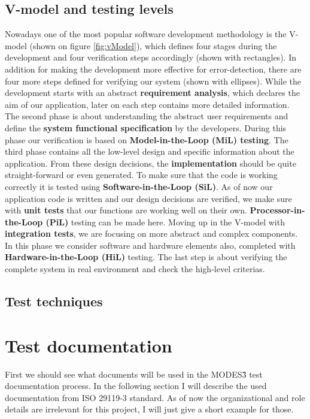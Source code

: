 \subsection{V-model and testing levels}
Nowadays one of the most popular software development methodology is the V-model \cite{Vmodel} (shown on figure \ref{fig:vModel}), which defines four stages during the development and four verification steps accordingly (shown with rectangles). In addition for making the development more effective for error-detection, there are four more steps defined for verifying our system \cite{TestLevels} (shown with ellipses). While the development starts with an abstract \textbf{requirement analysis}, which declares the aim of our application, later on each step contains more detailed information. The second phase is about understanding the abstract user requirements and define the \textbf{system functional specification} by the developers. During this phase our verification is based on \textbf{Model-in-the-Loop (MiL) testing}. The third phase contains all the low-level design and specific information about the application. From these design decisions, the \textbf{implementation} should be quite straight-forward or even generated. To make sure that the code is working correctly it is tested using \textbf{Software-in-the-Loop (SiL)}. 
As of now our application code is written and our design decisions are verified, we make sure with \textbf{unit tests} that our functions are working well on their own. \textbf{Processor-in-the-Loop (PiL)} testing can be made here. Moving up in the V-model with \textbf{integration tests}, we are focusing on more abstract and complex components. In this phase we consider software and hardware elements also, completed with \textbf{Hardware-in-the-Loop (HiL)} testing. The last step is about verifying the complete system in real environment and check the high-level criterias.

\subsection{Test techniques}


\section{Test documentation}
First we should see what documents will be used in the MODES\^3 test documentation process. In the following section I will describe the used documentation from ISO 29119-3 standard. As of now the organizational and role details are irrelevant for this project, I will just give a short example for those.

